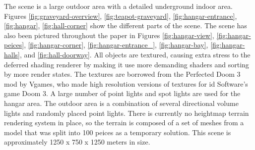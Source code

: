\documentclass[12pt]{ucthesis}
\begin{document}
The scene is a large outdoor area with a detailed underground indoor area.
Figures \ref{fig:graveyard-overview}, \ref{fig:teapot-graveyard}, \ref{fig:hangar-entrance}, \ref{fig:hangar}, \ref{fig:hall-corner} show the different parts of the scene.
The scene has also been pictured throughout the paper in Figures \ref{fig:hangar-view}, \ref{fig:hangar-peices}, \ref{fig:hangar-corner}, \ref{fig:hangar-entrance_}, \ref{fig:hangar-bay}, \ref{fig:hangar-halls}, and \ref{fig:hall-doorway}.
All objects are textured, causing extra stress to the deferred shading renderer by making it use more demanding shaders and sorting by more render states.
The textures are borrowed from the Perfected Doom 3 mod by Vgames, who made high resolution versions of textures for id Software's game Doom 3.\cite{Perf-Doom3}
A large number of point lights and spot lights are used for the hangar area.
The outdoor area is a combination of several directional volume lights and randomly placed point lights.
There is currently no heightmap terrain rendering system in place, so the terrain is composed of a set of meshes from a model that was split into 100 peices as a temporary solution.
This scene is approximately 1250 x 750 x 1250 meters in size.
\end{document}
